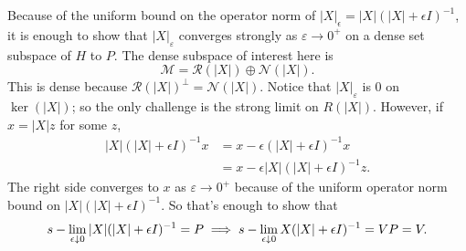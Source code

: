 \documentclass[a4paper,8pt]{ctexart}\textwidth 140mm \textheight 216mm
\newcommand{\e}{\varepsilon}
\newcommand{\8}{\infty}
\begin{document}
Because of the uniform bound on the operator norm of $|X|_{\epsilon}=|X|(|X|+\epsilon I)^{-1}$, it is enough to show that $|X|_{\e}$ converges strongly as $\e\to 0^+$ on a dense set subspace of $H$ to $P$. The dense subspace of interest here is
\[\mathcal{M}=\mathcal{R}(|X|)\oplus\mathcal{N}(|X|).\]
This is dense because $\mathcal{R}(|X|)^{\perp}=\mathcal{N}(|X|)$. Notice that $|X|_{\e}$ is $0$ on $\ker(|X|)$; so the only challenge is the strong limit on $R(|X|)$. However, if $x=|X|z$ for some $z$,
\[\begin{aligned}
	|X|(|X|+\epsilon I)^{-1}x & =x-\epsilon(|X|+\epsilon I)^{-1}x \\
	& = x -\epsilon|X|(|X|+\epsilon I)^{-1}z.
\end{aligned}\]
The right side converges to $x$ as $\e\to 0^+$ because of the uniform operator norm bound on $|X|(|X|+\epsilon I)^{-1}$. So that's enough to show that
\[s-\lim_{\epsilon\downarrow 0}|X|(|X|+\epsilon I)^{-1} = P \\
\implies s-\lim_{\epsilon\downarrow 0}X(|X|+\epsilon I)^{-1} = VP=V.\]
\end{document}
